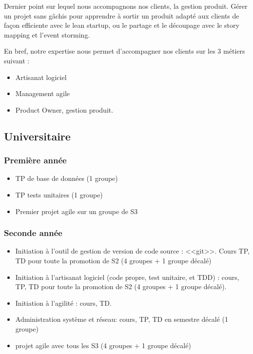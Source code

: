 \documentclass[a4paper]{article}
\begin{document}
Dernier point sur lequel nous accompagnons nos clients, la gestion produit. Gérer un projet sans gâchis pour apprendre à sortir un produit adapté aux clients de façon efficiente avec le lean startup, ou le partage et le découpage avec le story mapping et l'event storming.

En bref, notre expertise nous permet d'accompagner nos clients sur les 3 métiers suivant :
\begin{itemize}
  \item Artisanat logiciel
  \item Management agile
  \item Product Owner, gestion produit.
\end{itemize}

\subsection{Universitaire}

\subsubsection{Première année}
\begin{itemize}
  \item TP de base de données (1 groupe)
  \item TP tests unitaires (1 groupe)
  \item Premier projet agile sur un groupe de S3
\end{itemize}

\subsubsection{Seconde année}
\begin{itemize}
  \item Initiation à l'outil de gestion de version de code source : <<git>>. Cours TP, TD pour toute la promotion de S2 (4 groupes + 1 groupe décalé)
  \item Initiation à l'artisanat logiciel (code propre, test unitaire, et TDD) : cours, TP, TD pour toute la promotion de S2 (4 groupes + 1 groupe décalé).
  \item Initiation à l'agilité : cours, TD.
  \item Administration système et réseau: cours, TP, TD en semestre décalé (1 groupe)
  \item projet agile avec tous les S3 (4 groupes + 1 groupe décalé)
\end{itemize}
\end{document}
